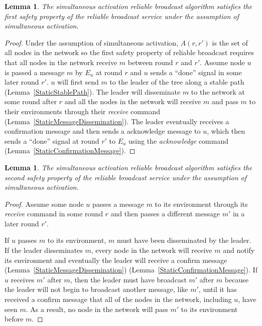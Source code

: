 \documentclass[english]{article}
\newtheorem{lemma}[theorem]{Lemma}
\begin{document}
\begin{lemma}
\label{StaticRBSafety1}
The simultaneous activation reliable broadcast algorithm satisfies the first safety property of the reliable broadcast service under the assumption of simultaneous activation.
\end{lemma}
\begin{proof}

Under the assumption of simultaneous activation, $A(r,r')$ is the set of all nodes in the network so the first safety property of reliable broadcast requires that all nodes in the network receive $m$ between round $r$ and $r'$. Assume node $u$ is passed a message $m$ by $E_u$ at round $r$ and $u$ sends  a ``done'' signal in some later round $r'$. $u$ will first send $m$ to the leader of the tree along a stable path (Lemma~\ref{StaticStablePath}). The leader will disseminate $m$ to the network at some round after $r$ and all the nodes in the network will receive $m$ and pass $m$ to their environments through their \textit{receive} command (Lemma~\ref{StaticMessageDissemination}). The leader eventually receives a confirmation message and then sends a acknowledge message to $u$, which then sends  a ``done'' signal at round $r'$ to $E_u$ using the \textit{acknowledge} command (Lemma~\ref{StaticConfirmationMessage}). 

\end{proof}


\begin{lemma}
\label{StaticRBSafety2}
The simultaneous activation reliable broadcast algorithm satisfies the second safety property of the reliable broadcast service under the assumption of simultaneous activation.
\end{lemma}
\begin{proof}

Assume some node $u$ passes a message $m$ to its environment through its \textit{receive} command in some round $r$ and then passes a different message $m'$ in a later round $r'$. 

If $u$ passes $m$ to its environment, $m$ must have been disseminated by the leader. If the leader disseminates $m$, every node in the network will receive $m$ and notify its environment and eventually the leader will receive a confirm message (Lemma~\ref{StaticMessageDissemination}) (Lemma~\ref{StaticConfirmationMessage}). If $u$ receives $m'$ after $m$, then the leader must have broadcast $m'$ after $m$ because the leader will not begin to broadcast another message, like $m'$, until it has received a confirm message that all of the nodes in the network, including $u$, have seen $m$. As a result, no node in the network will pass $m'$ to its environment before $m$.

\end{proof}
\end{document}
